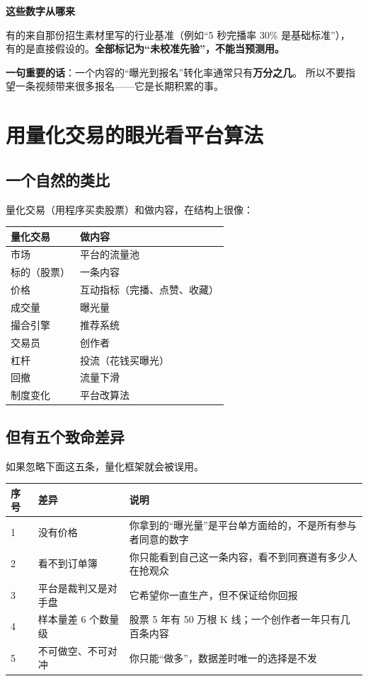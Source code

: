\documentclass[UTF8,a4paper,11pt]{ctexart}
\newenvironment{explainbox}[1]
{\begin{center}\begin{minipage}{0.94\textwidth}\colorbox{boxbg}{\parbox{0.92\textwidth}{\textbf{#1}\par\vspace{2pt}}}}
{\end{minipage}\end{center}}
\newcommand{\warn}[1]{\textcolor{red!70!black}{\textbf{#1}}}
\begin{document}
\begin{explainbox}{这些数字从哪来}
有的来自那份招生素材里写的行业基准（例如“5 秒完播率 30\% 是基础标准”），
有的是直接假设的。\warn{全部标记为“未校准先验”，不能当预测用。}
\end{explainbox}

\textbf{一句重要的话}：一个内容的“曝光到报名”转化率通常只有\textbf{万分之几}。
所以不要指望一条视频带来很多报名——它是长期积累的事。

\newpage

\section{用量化交易的眼光看平台算法}

\subsection{一个自然的类比}

量化交易（用程序买卖股票）和做内容，在结构上很像：

\begin{center}
\begin{tabular}{p{4.2cm}p{9.6cm}}
\toprule
\textbf{量化交易} & \textbf{做内容} \\
\midrule
市场 & 平台的流量池 \\
标的（股票） & 一条内容 \\
价格 & 互动指标（完播、点赞、收藏） \\
成交量 & 曝光量 \\
撮合引擎 & 推荐系统 \\
交易员 & 创作者 \\
杠杆 & 投流（花钱买曝光） \\
回撤 & 流量下滑 \\
制度变化 & 平台改算法 \\
\bottomrule
\end{tabular}
\end{center}

\subsection{但有五个致命差异}

如果忽略下面这五条，量化框架就会被误用。

\begin{longtable}{@{}p{0.8cm}p{3.4cm}p{9.6cm}@{}}
\toprule
\textbf{序号} & \textbf{差异} & \textbf{说明} \\
\midrule
1 & 没有价格 & 你拿到的“曝光量”是平台单方面给的，不是所有参与者同意的数字 \\
2 & 看不到订单簿 & 你只能看到自己这一条内容，看不到同赛道有多少人在抢观众 \\
3 & 平台是裁判又是对手盘 & 它希望你一直生产，但不保证给你回报 \\
4 & 样本量差 6 个数量级 & 股票 5 年有 50 万根 K 线；一个创作者一年只有几百条内容 \\
5 & 不可做空、不可对冲 & 你只能“做多”，数据差时唯一的选择是不发 \\
\bottomrule
\end{longtable}
\end{document}
